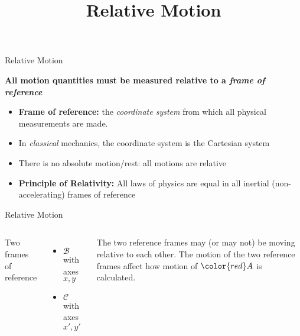 \documentclass[12pt,compress,aspectratio=169,dvipsnames]{beamer}
\title{Relative Motion}
\begin{document}
\begin{frame}{Relative Motion}
  
  \begin{block}{}
    \textbf{All motion quantities must be measured relative to a
      \emph{frame of reference}}
  \end{block}

  \vspace{.2in}
  \begin{itemize}
  \item\textbf{Frame of reference:} the \emph{coordinate system} from which all
    physical measurements are made.
  \item In \emph{classical} mechanics, the coordinate system is the
    Cartesian system
  \item There is no absolute motion/rest: all motions are relative
  \item\textbf{Principle of Relativity:} All laws of physics are equal in all
    inertial (non-accelerating) frames of reference
  \end{itemize}
\end{frame}  



\begin{frame}{Relative Motion}
  \begin{columns}
    
    Two frames of reference
    \begin{itemize}
    \item $\mathcal B$ with axes $x,y$
    \item $\mathcal C$ with axes $x',y'$
    \end{itemize}
    The two reference frames may (or may not) be moving relative to each other.
    The motion of the two reference frames affect how motion of
    $\color{red} A$ is calculated.
  \end{columns}
\end{frame}
\end{document}

